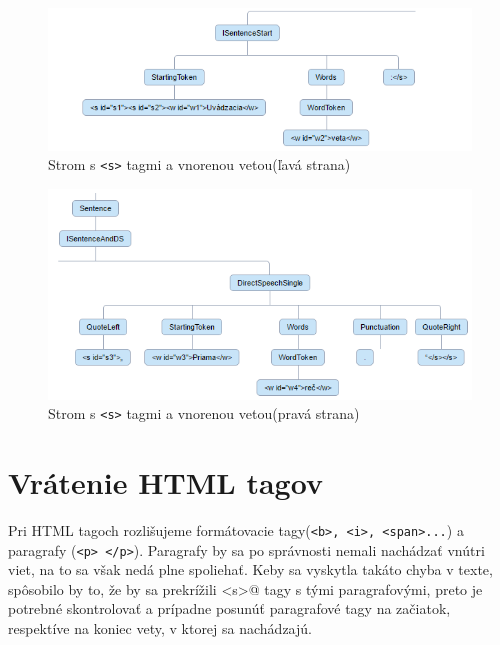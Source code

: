 \documentclass[12pt,a4paper]{report}
\theoremstyle{definition}
\theoremstyle{remark}
\begin{document}
\begin{figure}[H]
\centering
\includegraphics[scale=2.8]{sentenceTagsAndNestedSentenceLeft}
\caption{Strom s \texttt{<s>}  tagmi a vnorenou vetou(ľavá strana)}
\end{figure}
\begin{figure}[H]
\centering
\includegraphics[scale=2.6]{sentenceTagsAndNestedSentenceRight}
\caption{Strom s \texttt{<s>}  tagmi a vnorenou vetou(pravá strana)}
\end{figure}

\section{Vrátenie HTML tagov}
Pri HTML tagoch rozlišujeme formátovacie tagy(\verb!<b>, <i>, <span>...!) a paragrafy (\verb!<p> </p>!). Paragrafy by sa po správnosti nemali nachádzať vnútri viet, na to sa však nedá plne spoliehať. Keby sa vyskytla takáto chyba v texte, spôsobilo by to, že by sa prekrížili \verb@<s>@ tagy s tými paragrafovými, preto je potrebné skontrolovať a prípadne posunúť paragrafové tagy na začiatok, respektíve na koniec vety, v ktorej sa nachádzajú.
\end{document}
